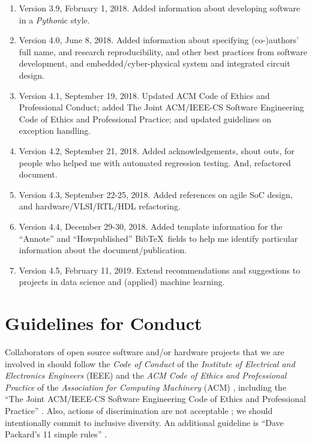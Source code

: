 \documentclass[letter,12pt]{article}
\begin{document}
\begin{enumerate}
\item Version 3.9, February 1, 2018. Added information about developing software in a {\it Python}ic style.
\item Version 4.0, June 8, 2018. Added information about specifying (co-)authors' full name, and research reproducibility, and other best practices from software development, and embedded/cyber-physical system and integrated circuit design.
\item Version 4.1, September 19, 2018. Updated ACM Code of Ethics and Professional Conduct; added The Joint {ACM/IEEE-CS} Software Engineering Code of Ethics and Professional Practice; and updated guidelines on exception handling.
\item Version 4.2, September 21, 2018. Added acknowledgements, shout outs, for people who helped me with automated regression testing. And, refactored document.
\item Version 4.3, September 22-25, 2018. Added references on agile SoC design, and hardware/VLSI/RTL/HDL refactoring.
\item Version 4.4, December 29-30, 2018. Added template information for the ``Annote'' and ``Howpublished'' {\sc Bib}\TeX\ fields to help me identify particular information about the document/publication.
\item Version 4.5, February 11, 2019. Extend recommendations and suggestions to projects in data science and (applied) machine learning.
\end{enumerate}









\section{Guidelines for Conduct}
\label{sec:GuidelinesforConduct}

Collaborators of open source software and/or hardware projects that we are involved in should follow the {\it Code of Conduct} of the {\it Institute of Electrical and Electronics Engineers} (IEEE) \cite{IEEE2014b,IEEE2014a,IEEE2014} and the {\it ACM Code of Ethics and Professional Practice} of the {\it Association for Computing Machinery} (ACM) \cite{Gotterbarn2018b,Gotterbarn2018a,Gotterbarn2018,Brinkman2016a,ACMCouncil1992,Brinkman2017,Brinkman2016,Wolf2016,Anderson1993}, including the ``The Joint {ACM/IEEE-CS} Software Engineering Code of Ethics and Professional Practice'' \cite{Gotterbarn1999,Gotterbarn1997}. Also, actions of discrimination are not acceptable \cite{IEEE2014c}; we should intentionally commit to inclusive diversity. An additional guideline is ``Dave Packard's 11 simple rules'' \cite{HewlettPackardCompany2012}. \\
\end{document}
